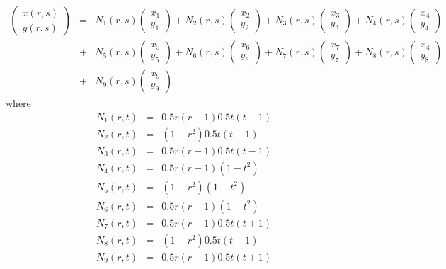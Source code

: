 \begin{eqnarray}
\left(
\begin{array}{c}
x(r,s) \\ y(r,s)
\end{array}
\right)
&=&
N_1(r,s)
\left(
\begin{array}{c}
x_1 \\ y_1
\end{array}
\right)
+
N_2(r,s)
\left(
\begin{array}{c}
x_2 \\ y_2
\end{array}
\right)
+
N_3(r,s)
\left(
\begin{array}{c}
x_3 \\ y_3
\end{array}
\right)
+
N_4(r,s)
\left(
\begin{array}{c}
x_4 \\ y_4
\end{array}
\right) \nonumber\\
&+&
N_5(r,s)
\left(
\begin{array}{c}
x_5 \\ y_5
\end{array}
\right)
+
N_6(r,s)
\left(
\begin{array}{c}
x_6 \\ y_6
\end{array}
\right)
+
N_7(r,s)
\left(
\begin{array}{c}
x_7 \\ y_7
\end{array}
\right)
+
N_8(r,s)
\left(
\begin{array}{c}
x_4 \\ y_8
\end{array}
\right) \nonumber\\
&+&
N_9(r,s)
\left(
\begin{array}{c}
x_9 \\ y_9
\end{array}
\right) 
\nonumber
\end{eqnarray}
where
\begin{eqnarray}
N_1(r,t)&=& 0.5r(r-1)  0.5t(t-1) \nonumber\\
N_2(r,t)&=&      (1-r^2)  0.5t(t-1) \nonumber\\
N_3(r,t)&=& 0.5r(r+1)  0.5t(t-1) \nonumber\\
N_4(r,t)&=& 0.5r(r-1)       (1-t^2) \nonumber\\
N_5(r,t)&=&      (1-r^2)       (1-t^2) \nonumber\\
N_6(r,t)&=& 0.5r(r+1)       (1-t^2) \nonumber\\
N_7(r,t)&=& 0.5r(r-1)  0.5t(t+1) \nonumber\\
N_8(r,t)&=&      (1-r^2)  0.5t(t+1) \nonumber\\
N_9(r,t)&=& 0.5r(r+1)  0.5t(t+1) \nonumber
\end{eqnarray}


